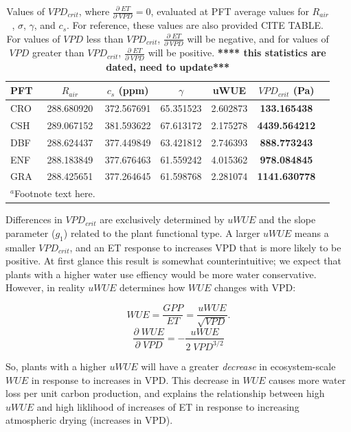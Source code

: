 \documentclass[draft,linenumbers]{gcbjournal}
\begin{document}
\begin{table}  
\caption{Values of $VPD_{crit}$, where $\frac{\partial \; ET}{\partial \; VPD} = 0$, evaluated at PFT average values for $R_{air}$, $\sigma$, $\gamma$, and $c_s$. For reference, these values are also provided CITE TABLE. For values of $VPD$ less than $VPD_{crit}$, $\frac{\partial \; ET}{\partial \; VPD}$ will be negative, and for values of $VPD$ greater than $VPD_{crit}$, $\frac{\partial \; ET}{\partial \; VPD}$ will be positive. \textbf{**** this statistics are dated, need to update***}}
\centering
\begin{tabular}{l c c c c c c}
  \hline
  PFT & $R_{air}$ & $c_s$ (ppm) & $\gamma$ &  uWUE    & \textbf{$VPD_{crit}$ (Pa)} \\
  \hline
  CRO &  288.680920 & 372.567691& 65.351523& 2.602873&  \textbf{133.165438} \\
  CSH &   289.067152& 381.593622& 67.613172& 2.175278& \textbf{4439.564212} \\
  DBF &   288.624437& 377.449849& 63.421812& 2.746393&  \textbf{888.773243} \\
  ENF &  288.183849& 377.676463& 61.559242& 4.015362&  \textbf{978.084845} \\
  GRA &  288.425651& 377.264645& 61.598768& 2.281074& \textbf{1141.630778} \\
\hline
\multicolumn{2}{l}{$^{a}$Footnote text here.}
\end{tabular}
\label{vpd_crit}
\end{table}

Differences in $VPD_{crit}$ are exclusively determined by $uWUE$ and the slope parameter ($g_1$) related to the plant functional type. A larger $uWUE$ means a smaller $VPD_{crit}$, and an ET response to increases VPD that is more likely to be positive. At first glance this result is somewhat counterintuitive; we expect that plants with a higher water use effiency would be more water conservative. However, in reality $uWUE$ determines how $WUE$ changes with VPD:

\[WUE = \frac{GPP}{ET} = \frac{uWUE}{\sqrt{VPD}}.\]
\[\frac{\partial \; WUE}{\partial \; VPD} = -\frac{uWUE}{2 \; VPD^{3/2}}\]

So, plants with a higher $uWUE$ will have a greater \textit{decrease} in ecosystem-scale $WUE$ in response to increases in VPD. This decrease in $WUE$ causes more water loss per unit carbon production, and explains the relationship between high $uWUE$ and high liklihood of increases of ET in response to increasing atmospheric drying (increases in VPD).
\end{document}
